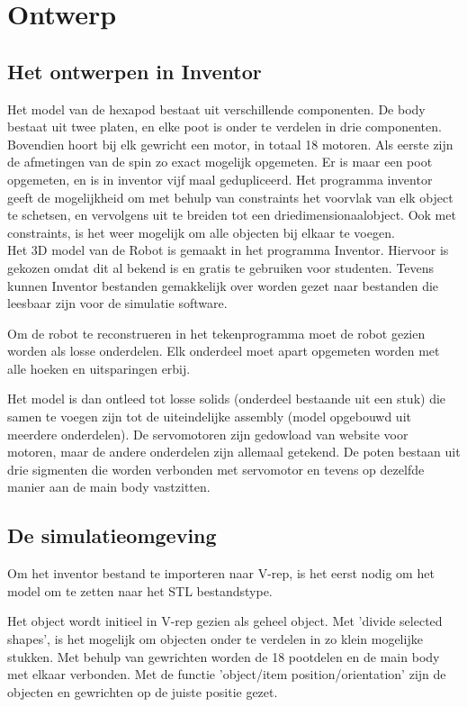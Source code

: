 \documentclass[10pt,a4paper]{article}
\begin{document}
\section{Ontwerp}
\subsection{Het ontwerpen in Inventor}
Het model van de hexapod bestaat uit verschillende componenten. De body bestaat uit twee platen, en elke poot is onder te verdelen in drie componenten. Bovendien hoort bij elk gewricht een motor, in totaal 18 motoren. Als eerste zijn de afmetingen van de spin zo exact mogelijk opgemeten. Er is maar een poot opgemeten, en is in inventor vijf maal gedupliceerd. Het programma inventor geeft de mogelijkheid om met behulp van constraints het voorvlak van elk object te schetsen, en vervolgens uit te breiden tot een driedimensionaalobject. Ook met constraints, is het weer mogelijk om alle objecten bij elkaar te voegen.\\

Het 3D model van de Robot is gemaakt in het programma Inventor. Hiervoor is gekozen omdat dit al bekend is en gratis te gebruiken voor studenten. Tevens kunnen Inventor bestanden gemakkelijk over worden gezet naar bestanden die leesbaar zijn voor de simulatie software.
 
Om de robot te reconstrueren in het tekenprogramma moet de robot gezien worden als losse onderdelen. Elk onderdeel moet apart opgemeten worden met alle hoeken en uitsparingen erbij.

Het model is dan ontleed tot losse solids (onderdeel bestaande uit een stuk) die samen te voegen zijn tot de uiteindelijke assembly (model opgebouwd uit meerdere onderdelen).
De servomotoren zijn gedowload van website voor motoren, maar de andere onderdelen zijn allemaal getekend. De poten bestaan uit drie sigmenten die worden verbonden met servomotor en tevens op dezelfde manier aan de main body vastzitten. \\



\subsection{De simulatieomgeving}
Om het inventor bestand te importeren naar V-rep, is het eerst nodig om het model om te zetten naar het STL bestandstype.

Het object wordt initieel in V-rep gezien als geheel object. Met 'divide selected shapes', is het mogelijk om objecten onder te verdelen in zo klein mogelijke stukken. Met behulp van gewrichten worden de 18 pootdelen en de main body met elkaar verbonden. Met de functie 'object/item position/orientation' zijn de objecten en gewrichten op de juiste positie gezet.
\end{document}
